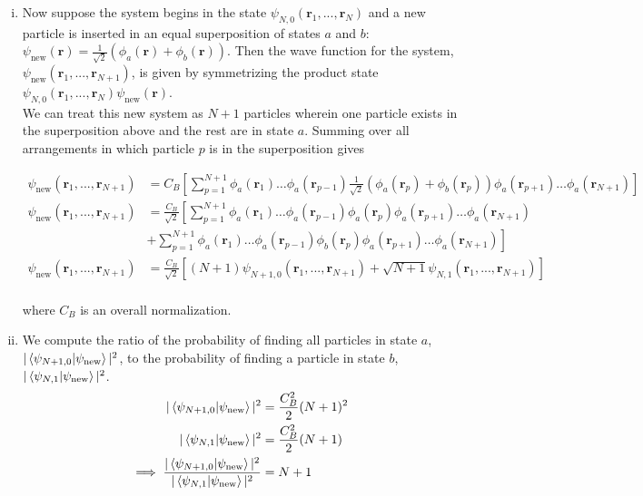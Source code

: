 \documentclass[]{article}
\begin{document}
\begin{enumerate}[1.]
\begin{enumerate}[i.]
\item Now suppose the system begins in the state $\psi_{N,0} (\bm{r}_1, ..., \bm{r}_{N} )$ and a new particle is inserted in an equal superposition of states $a$ and $b$: $\psi_{\text{new}} (\bm{r}) = \frac{1}{\sqrt{2}} \left(  \phi_a(\bm{r}) + \phi_b(\bm{r}) \right)$. Then the wave function for the system, $\psi_{\text{new}} (\bm{r}_1, ..., \bm{r}_{N+1} )$, is given by symmetrizing the product state $\psi_{N,0} (\bm{r}_1, ..., \bm{r}_{N} )\psi_{\text{new}} (\bm{r})$. \\
We can treat this new system as $N+1$ particles wherein one particle exists in the superposition above and the rest are in state $a$. Summing over all arrangements in which particle $p$ is in the superposition gives

\begin{equation}
\begin{split}
\psi_{\text{new}} (\bm{r}_1, ..., \bm{r}_{N+1} ) & = C_B \left[  \sum_{p=1}^{N+1}   \phi_a( \bm{r}_1) \dots \phi_a(\bm{r}_{p-1})  \frac{1}{\sqrt{2}} \left(  \phi_a(\bm{r}_p) + \phi_b(\bm{r}_p) \right)\phi_a(\bm{r}_{p+1}) \dots \phi_a(\bm{r}_{N+1})   \right] \\
\psi_{\text{new}} (\bm{r}_1, ..., \bm{r}_{N+1} ) & =  \frac{C_B}{\sqrt{2}}  \left[  \sum_{p=1}^{N+1}   \phi_a( \bm{r}_1) \dots \phi_a(\bm{r}_{p-1}) \phi_a(\bm{r}_p)\phi_a(\bm{r}_{p+1}) \dots \phi_a(\bm{r}_{N+1})   \right.
 \\ & \left. +  \sum_{p=1}^{N+1}   \phi_a( \bm{r}_1) \dots \phi_a(\bm{r}_{p-1})\phi_b(\bm{r}_p)\phi_a(\bm{r}_{p+1}) \dots \phi_a(\bm{r}_{N+1})   \right] \\
\psi_{\text{new}} (\bm{r}_1, ..., \bm{r}_{N+1} ) & =  \frac{C_B}{\sqrt{2}}  \left[  (N+1) \psi_{N+1,0} (\bm{r}_1, ..., \bm{r}_{N+1} ) + \sqrt{N+1} \psi_{N,1} (\bm{r}_1, ..., \bm{r}_{N+1} )    \right] \\
\end{split}
\end{equation}

where $C_B$ is an overall normalization. \\

\item We compute the ratio of the probability of finding all particles in state $a$, $|\braket{\psi_{N+1,0}}{\psi_{\text{new}}}|^2$, to the probability of finding a particle in state $b$, $| \braket{\psi_{N,1}}{\psi_{\text{new}}} |^2$. \\

\begin{equation}
\begin{split}
|\braket{\psi_{N+1,0}}{\psi_{\text{new}}}|^2 & = \frac{C_B^2}{2}(N+1)^2 \\ 
|\braket{\psi_{N,1}}{\psi_{\text{new}}}|^2 & = \frac{C_B^2}{2}(N+1) \\ 
\implies \frac{|\braket{\psi_{N+1,0}}{\psi_{\text{new}}}|^2}{|\braket{\psi_{N,1}}{\psi_{\text{new}}}|^2} & = N+1 \\
\end{split}
\end{equation}


\end{enumerate}
\end{enumerate}
\end{document}
